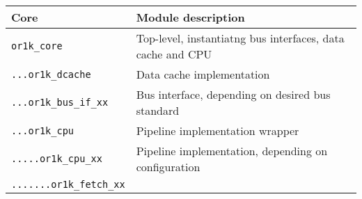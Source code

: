 \documentclass[]{article}
\begin{document}
\begin{longtable}[]{@{}ll@{}}
\toprule
\begin{minipage}[b]{0.29\columnwidth}\raggedright\strut
Core\strut
\end{minipage} & \begin{minipage}[b]{0.65\columnwidth}\raggedright\strut
Module description\strut
\end{minipage}\tabularnewline
\midrule
\endhead
\begin{minipage}[t]{0.29\columnwidth}\raggedright\strut
\texttt{or1k\_core}\strut
\end{minipage} & \begin{minipage}[t]{0.65\columnwidth}\raggedright\strut
Top-level, instantiatng bus interfaces, data cache and CPU\strut
\end{minipage}\tabularnewline
\begin{minipage}[t]{0.29\columnwidth}\raggedright\strut
\texttt{...or1k\_dcache}\strut
\end{minipage} & \begin{minipage}[t]{0.65\columnwidth}\raggedright\strut
Data cache implementation\strut
\end{minipage}\tabularnewline
\begin{minipage}[t]{0.29\columnwidth}\raggedright\strut
\texttt{...or1k\_bus\_if\_xx}\strut
\end{minipage} & \begin{minipage}[t]{0.65\columnwidth}\raggedright\strut
Bus interface, depending on desired bus standard\strut
\end{minipage}\tabularnewline
\begin{minipage}[t]{0.29\columnwidth}\raggedright\strut
\texttt{...or1k\_cpu}\strut
\end{minipage} & \begin{minipage}[t]{0.65\columnwidth}\raggedright\strut
Pipeline implementation wrapper\strut
\end{minipage}\tabularnewline
\begin{minipage}[t]{0.29\columnwidth}\raggedright\strut
\texttt{.....or1k\_cpu\_xx}\strut
\end{minipage} & \begin{minipage}[t]{0.65\columnwidth}\raggedright\strut
Pipeline implementation, depending on configuration\strut
\end{minipage}\tabularnewline
\begin{minipage}[t]{0.29\columnwidth}\raggedright\strut
\texttt{.......or1k\_fetch\_xx}\strut
\end{minipage} & \begin{minipage}[t]{0.65\columnwidth}\raggedright\strut

\end{minipage}
\end{longtable}
\end{document}
